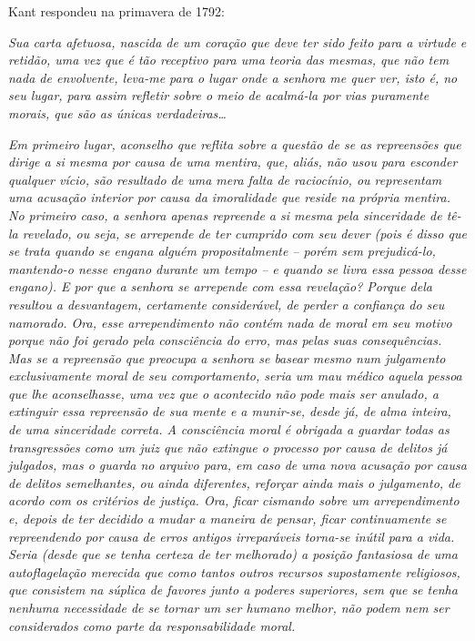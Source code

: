 Kant respondeu na primavera de 1792:

\emph{Sua carta afetuosa, nascida de um coração que deve ter sido feito
para a virtude e retidão, uma vez que é tão receptivo para uma teoria
das mesmas, que não tem nada de envolvente, leva-me para o lugar onde a
senhora me quer ver, isto é, no seu lugar, para assim refletir sobre o
meio de acalmá-la por vias puramente morais, que são as únicas
verdadeiras\ldots{}}

\emph{Em primeiro lugar, aconselho que reflita sobre a questão de se as
repreensões que dirige a si mesma por causa de uma mentira, que, aliás,
não usou para esconder qualquer vício, são resultado de uma mera falta
de raciocínio, ou representam uma acusação interior por causa da
imoralidade que reside na própria mentira. No primeiro caso, a senhora
apenas repreende a si mesma pela sinceridade de tê-la revelado, ou seja,
se arrepende de ter cumprido com seu dever (pois é disso que se trata
quando se engana alguém propositalmente -- porém sem prejudicá-lo,
mantendo-o nesse engano durante um tempo -- e quando se livra essa
pessoa desse engano). E por que a senhora se arrepende com essa
revelação? Porque dela resultou a desvantagem, certamente considerável,
de perder a confiança do seu namorado. Ora, esse arrependimento não
contém nada de moral em seu motivo porque não foi gerado pela
consciência do erro, mas pelas suas consequências. Mas se a repreensão
que preocupa a senhora se basear mesmo num julgamento exclusivamente
moral de seu comportamento, seria um mau médico aquela pessoa que lhe
aconselhasse, uma vez que o acontecido não pode mais ser anulado, a
extinguir essa repreensão de sua mente e a munir-se, desde já, de alma
inteira, de uma sinceridade correta. A consciência moral é obrigada a
guardar todas as transgressões como um juiz que não extingue o processo
por causa de delitos já julgados, mas o guarda no arquivo para, em caso
de uma nova acusação por causa de delitos semelhantes, ou ainda
diferentes, reforçar ainda mais o julgamento, de acordo com os critérios
de justiça. Ora, ficar cismando sobre um arrependimento e, depois de ter
decidido a mudar a maneira de pensar, ficar continuamente se
repreendendo por causa de erros antigos irreparáveis torna-se inútil
para a vida. Seria (desde que se tenha certeza de ter melhorado) a
posição fantasiosa de uma autoflagelação merecida que como tantos outros
recursos supostamente religiosos, que consistem na súplica de favores
junto a poderes superiores, sem que se tenha nenhuma necessidade de se
tornar um ser humano melhor, não podem nem ser considerados como parte
da responsabilidade moral.}

